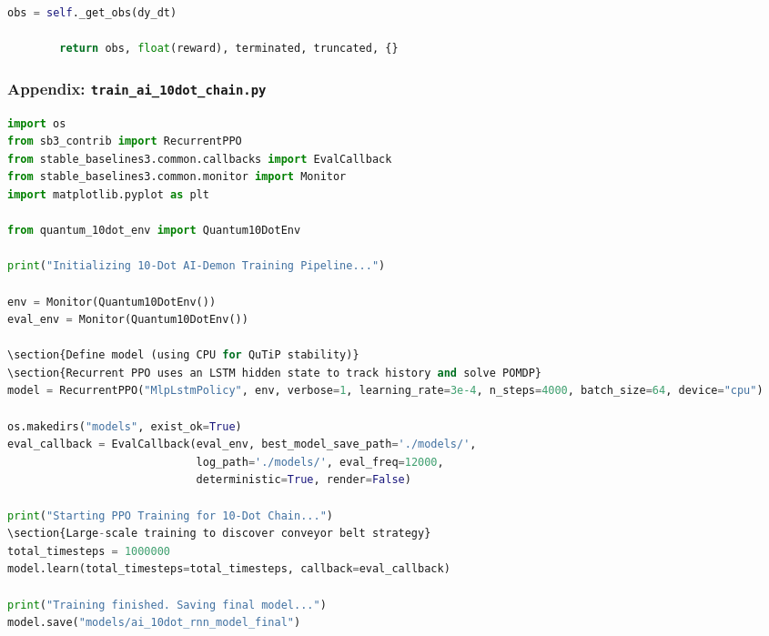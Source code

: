 \documentclass[a4paper,11pt,twocolumn]{article}
\begin{document}
\begin{CJK*}{UTF8}{min}
\begin{lstlisting}[language=Python]
        obs = self._get_obs(dy_dt)
        
        return obs, float(reward), terminated, truncated, {}

\end{lstlisting}

\subsubsection{Appendix: \texttt{train\_ai\_10dot\_chain.py}}

\begin{lstlisting}[language=Python]
import os
from sb3_contrib import RecurrentPPO
from stable_baselines3.common.callbacks import EvalCallback
from stable_baselines3.common.monitor import Monitor
import matplotlib.pyplot as plt

from quantum_10dot_env import Quantum10DotEnv

print("Initializing 10-Dot AI-Demon Training Pipeline...")

env = Monitor(Quantum10DotEnv())
eval_env = Monitor(Quantum10DotEnv())

\section{Define model (using CPU for QuTiP stability)}
\section{Recurrent PPO uses an LSTM hidden state to track history and solve POMDP}
model = RecurrentPPO("MlpLstmPolicy", env, verbose=1, learning_rate=3e-4, n_steps=4000, batch_size=64, device="cpu")

os.makedirs("models", exist_ok=True)
eval_callback = EvalCallback(eval_env, best_model_save_path='./models/',
                             log_path='./models/', eval_freq=12000,
                             deterministic=True, render=False)

print("Starting PPO Training for 10-Dot Chain...")
\section{Large-scale training to discover conveyor belt strategy}
total_timesteps = 1000000 
model.learn(total_timesteps=total_timesteps, callback=eval_callback)

print("Training finished. Saving final model...")
model.save("models/ai_10dot_rnn_model_final")


\end{lstlisting}
\end{CJK*}
\end{document}
